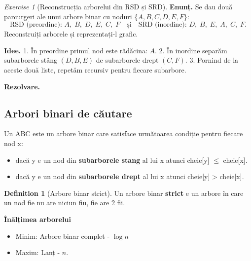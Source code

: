 \documentclass[11pt,a4paper]{article}
\theoremstyle{definition}
\newtheorem{definition}{Definition}[section]
\theoremstyle{plain}
\theoremstyle{remark}
\newtheorem{exercise}{Exercise}[section]
\begin{document}
\begin{exercise}[Reconstrucția arborelui din RSD și SRD]
\textbf{Enunț.}
Se dau două parcurgeri ale unui arbore binar cu noduri \(\{A,B,C,D,E,F\}\):
\[
\text{RSD (preordine): } A,\;B,\;D,\;E,\;C,\;F
\quad\text{și}\quad
\text{SRD (inordine): } D,\;B,\;E,\;A,\;C,\;F.
\]
Reconstruiți arborele și reprezentați-l grafic.

\vspace{0.5em}
\textbf{Idee.}
1. În preordine primul nod este rădăcina: \(A\).
2. În inordine separăm subarborele stâng \((D,B,E)\) de subarborele drept \((C,F)\).
3. Pornind de la aceste două liste, repetăm recursiv pentru fiecare subarbore.

\vspace{0.5em}
\textbf{Rezolvare.}
\begin{center}
\end{center}
\end{exercise}

\subsection{Arbori binari de căutare}

Un ABC este un arbore binar care satisface următoarea condiție pentru fiecare nod x:

\begin{itemize}
  \item dacă y e un nod din \textbf{subarborele stang} al lui x atunci cheie[y] $\le$ cheie[x].
  \item dacă y e un nod din \textbf{subarborele drept} al lui x atunci cheie[y] > cheie[x].
\end{itemize}

\begin{definition}[Arbore binar strict]
  Un arbore binar \textbf{strict} e un arbore în care un nod fie nu are niciun fiu, fie are 2 fii.
\end{definition}

\noindent\textbf{Înălțimea arborelui}
\begin{itemize}
  \item Minim: Arbore binar complet - $\log n$
  \item Maxim: Lanț - $n$.
\end{itemize}
\end{document}
